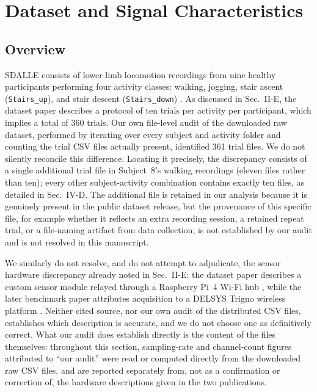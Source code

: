 \documentclass[conference]{IEEEtran}
\begin{document}
\section{Dataset and Signal Characteristics}
\label{sec:dataset}

\subsection{Overview}

SDALLE consists of lower-limb locomotion recordings from nine
healthy participants performing four activity classes: walking,
jogging, stair ascent (\texttt{Stairs\_up}), and stair descent
(\texttt{Stairs\_down}) \cite{el-khoreby2025sdalle, farouk2026sdalle}.
As discussed in Sec.~II-E, the dataset paper describes a protocol of
ten trials per activity per participant, which implies a total of
360 trials. Our own file-level audit of the downloaded raw dataset,
performed by iterating over every subject and activity folder and
counting the trial CSV files actually present, identified 361 trial
files. We do not silently reconcile this difference. Locating it
precisely, the discrepancy consists of a single additional trial
file in Subject~8's walking recordings (eleven files rather than
ten); every other subject-activity combination contains exactly ten
files, as detailed in Sec.~IV-D. The additional file is retained in
our analysis because it is genuinely present in the public dataset
release, but the provenance of this specific file, for example
whether it reflects an extra recording session, a retained repeat
trial, or a file-naming artifact from data collection, is not
established by our audit and is not resolved in this manuscript.

We similarly do not resolve, and do not attempt to adjudicate, the
sensor hardware discrepancy already noted in Sec.~II-E: the dataset
paper describes a custom sensor module relayed through a Raspberry
Pi~4 Wi-Fi hub \cite{el-khoreby2025sdalle}, while the later benchmark
paper attributes acquisition to a DELSYS Trigno wireless platform
\cite{farouk2026sdalle}. Neither cited source, nor our own audit of
the distributed CSV files, establishes which description is
accurate, and we do not choose one as definitively correct. What our
audit does establish directly is the content of the files
themselves: throughout this section, sampling-rate and channel-count
figures attributed to ``our audit'' were read or computed directly
from the downloaded raw CSV files, and are reported separately from,
not as a confirmation or correction of, the hardware descriptions
given in the two publications.
\end{document}
